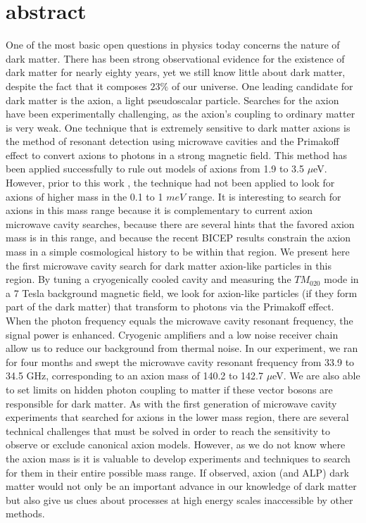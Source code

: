 \documentclass[12pt,twosides]{book}
\begin{document}
\section{abstract}

One of the most basic open questions in physics today concerns the nature of dark matter. There has been strong observational evidence for the existence of dark matter for nearly eighty years, yet we still know little about dark matter, despite the fact that it composes $23\%$ of our universe. One leading candidate for dark matter is the axion, a light pseudoscalar particle. Searches for the axion have been experimentally challenging, as the axion's coupling to ordinary matter is very weak. One technique that is extremely sensitive to dark matter axions is the method of resonant detection using microwave cavities and the Primakoff effect to convert axions to photons in a strong magnetic field. This method has been applied successfully to rule out models of axions from 1.9 to 3.5 $\mu$eV. However, prior to this work , the technique had not been applied to look for axions of higher mass in the 0.1 to 1 $meV$ range. It is interesting to search for axions in this mass range because it is complementary to current axion microwave cavity searches, because there are several hints that the favored axion mass is in this range, and because the recent BICEP results constrain the axion mass in a simple cosmological history to be within that region. We present here the first microwave cavity search for dark matter axion-like particles in this region. By tuning a cryogenically cooled cavity and measuring the $TM_{020}$ mode in a 7 Tesla background magnetic field, we look for axion-like particles (if they form part of the dark matter) that transform to photons via the Primakoff effect. When the photon frequency equals the microwave cavity resonant frequency, the signal power is enhanced. Cryogenic amplifiers and a low noise receiver chain allow us to reduce our background from thermal noise. In our experiment, we ran for four months and swept the microwave cavity resonant frequency from 33.9 to 34.5 GHz, corresponding to an axion mass of 140.2  to 142.7 $\mu$eV. We are also able to set limits on hidden photon coupling to matter if these vector bosons are responsible for dark matter. As with the first generation of microwave cavity experiments that searched for axions in the lower mass region, there are several technical challenges that must be solved in order to reach the sensitivity to observe or exclude canonical axion models. However, as we do not know where the axion mass is it is valuable to develop experiments and techniques to search for them in their entire possible mass range. If observed, axion (and ALP) dark matter would not only be an important advance in our knowledge of dark matter but also give us clues about processes at high energy scales inaccessible by other methods.
\end{document}
